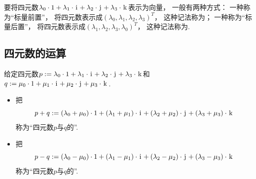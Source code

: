 要将四元数\(\lambda_0 \cdot 1 + \lambda_1 \cdot \kern1pt\mathrm{i}\kern1pt + \lambda_2 \cdot \kern1pt\mathrm{j}\kern1pt + \lambda_3 \cdot \kern1pt\mathrm{k}\kern1pt\)表示为向量，
一般有两种方式：
一种称为“标量前置”，
将四元数表示成\((\lambda_0,\lambda_1,\lambda_2,\lambda_3)^T\)，
这种记法称为；
一种称为“标量后置”，
将四元数表示成\((\lambda_1,\lambda_2,\lambda_3,\lambda_0)^T\)，
这种记法称为.

\subsection{四元数的运算}
\begin{definition}
给定四元数\(
	p
	:=
	\lambda_0 \cdot 1
	+ \lambda_1 \cdot \kern1pt\mathrm{i}\kern1pt
	+ \lambda_2 \cdot \kern1pt\mathrm{j}\kern1pt
	+ \lambda_3 \cdot \kern1pt\mathrm{k}\kern1pt
\)和\(
	q
	:=
	\mu_0 \cdot 1
	+ \mu_1 \cdot \kern1pt\mathrm{i}\kern1pt
	+ \mu_2 \cdot \kern1pt\mathrm{j}\kern1pt
	+ \mu_3 \cdot \kern1pt\mathrm{k}\kern1pt
\).
\begin{itemize}
	\item 把\begin{equation}
		p + q
		:=
		(\lambda_0 + \mu_0) \cdot 1
		+ (\lambda_1 + \mu_1) \cdot \kern1pt\mathrm{i}\kern1pt
		+ (\lambda_2 + \mu_2) \cdot \kern1pt\mathrm{j}\kern1pt
		+ (\lambda_3 + \mu_3) \cdot \kern1pt\mathrm{k}\kern1pt
	\end{equation}
	称为“四元数\(p\)与\(q\)的”.

	\item 把\begin{equation}
		p - q
		:=
		(\lambda_0 - \mu_0) \cdot 1
		+ (\lambda_1 - \mu_1) \cdot \kern1pt\mathrm{i}\kern1pt
		+ (\lambda_2 - \mu_2) \cdot \kern1pt\mathrm{j}\kern1pt
		+ (\lambda_3 - \mu_3) \cdot \kern1pt\mathrm{k}\kern1pt
	\end{equation}
	称为“四元数\(p\)与\(q\)的”.


\end{itemize}
\end{definition}
